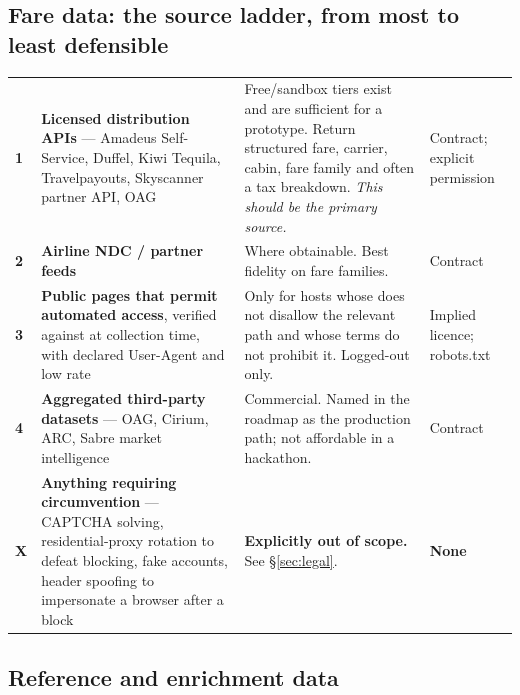 \subsection{Fare data: the source ladder, from most to least defensible}

\begin{center}
\footnotesize
\begin{tabularx}{\textwidth}{@{}C{0.8cm} L{3.6cm} X L{2.6cm}@{}}
\toprule
{} &  &  &  \\
\midrule
\textbf{1} & \textbf{Licensed distribution APIs} --- Amadeus Self-Service, Duffel, Kiwi Tequila, Travelpayouts, Skyscanner partner API, OAG & Free/sandbox tiers exist and are sufficient for a prototype. Return structured fare, carrier, cabin, fare family and often a tax breakdown. \emph{This should be the primary source.} & Contract; explicit permission \\
\addlinespace[2pt]
\textbf{2} & \textbf{Airline NDC / partner feeds} & Where obtainable. Best fidelity on fare families. & Contract \\
\addlinespace[2pt]
\textbf{3} & \textbf{Public pages that permit automated access}, verified against  at collection time, with declared User-Agent and low rate & Only for hosts whose  does not disallow the relevant path and whose terms do not prohibit it. Logged-out only. & Implied licence; robots.txt \\
\addlinespace[2pt]
\textbf{4} & \textbf{Aggregated third-party datasets} --- OAG, Cirium, ARC, Sabre market intelligence & Commercial. Named in the roadmap as the production path; not affordable in a hackathon. & Contract \\
\midrule
{}
\textbf{X} & \textbf{Anything requiring circumvention} --- CAPTCHA solving, residential-proxy rotation to defeat blocking, fake accounts, header spoofing to impersonate a browser after a block & \textbf{Explicitly out of scope.} See \S\ref{sec:legal}. & \textbf{None} \\
\bottomrule
\end{tabularx}
\end{center}

\subsection{Reference and enrichment data}

